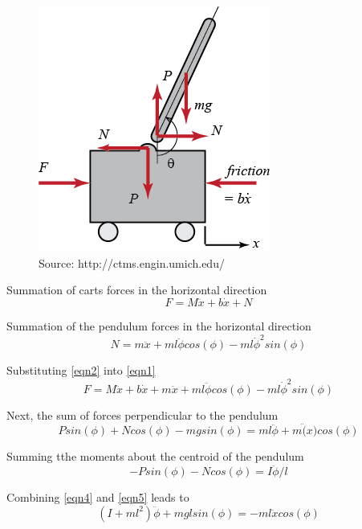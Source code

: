 \documentclass{article}
\begin{document}
\begin{figure}[!htb]
\centering
\includegraphics{pendulumfbd}
\caption{Source: http://ctms.engin.umich.edu/}
\end{figure}

Summation of carts forces in the horizontal direction
\begin{equation} 
\label{eqn1}
F = M\ddot{x}+b\dot{x} + N
\end{equation}

Summation of the pendulum forces in the horizontal direction
\begin{equation} 
\label{eqn2}
N = m\ddot{x}+m l \ddot{\phi} cos(\phi)-m l \dot{\phi}^2sin(\phi)
\end{equation}

Substituting \ref{eqn2} into \ref{eqn1}
\begin{equation} 
\label{eqn3}
F = M\ddot{x}+b\dot{x} + m\ddot{x}+m l \ddot{\phi} cos(\phi)-m l \dot{\phi}^2sin(\phi)
\end{equation}

Next, the sum of forces perpendicular to the pendulum
\begin{equation} 
\label{eqn4}
Psin(\phi)+Ncos(\phi)-mgsin(\phi) = m l \ddot{\phi} + m\ddot(x)cos(\phi)
\end{equation}

Summing tthe moments about the centroid of the pendulum
\begin{equation} 
\label{eqn5}
-P sin(\phi)-N cos(\phi) = I \ddot{\phi}/l
\end{equation}

Combining \ref{eqn4} and \ref{eqn5} leads to 
\begin{equation} 
\label{eqn6}
(I+m l^2)\ddot{\phi} + m g lsin(\phi) = -m l \ddot{x} cos(\phi)
\end{equation}
\end{document}
